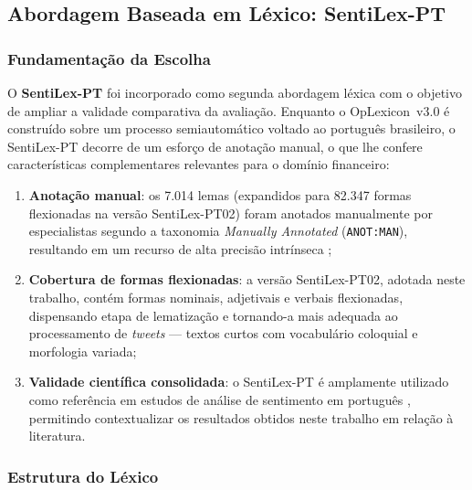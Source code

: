 \subsection{Abordagem Baseada em Léxico: SentiLex-PT}
\label{subsec:abordagem_sentilex}

\subsubsection{Fundamentação da Escolha}
\label{subsubsec:justificativa_sentilex}

O \textbf{SentiLex-PT} \cite{silva2012sentilex} foi incorporado como segunda abordagem léxica com o objetivo de ampliar a validade comparativa da avaliação. Enquanto o OpLexicon~v3.0 é construído sobre um processo semiautomático voltado ao português brasileiro, o SentiLex-PT decorre de um esforço de anotação manual, o que lhe confere características complementares relevantes para o domínio financeiro:

\begin{enumerate}
	\item \textbf{Anotação manual}: os 7.014 lemas (expandidos para 82.347 formas flexionadas na versão SentiLex-PT02) foram anotados manualmente por especialistas segundo a taxonomia \textit{Manually Annotated} (\texttt{ANOT:MAN}), resultando em um recurso de alta precisão intrínseca \cite{silva2012sentilex};

	\item \textbf{Cobertura de formas flexionadas}: a versão SentiLex-PT02, adotada neste trabalho, contém formas nominais, adjetivais e verbais flexionadas, dispensando etapa de lematização e tornando-a mais adequada ao processamento de \textit{tweets} --- textos curtos com vocabulário coloquial e morfologia variada;

	\item \textbf{Validade científica consolidada}: o SentiLex-PT é amplamente utilizado como referência em estudos de análise de sentimento em português \cite{liu2020survey}, permitindo contextualizar os resultados obtidos neste trabalho em relação à literatura.
\end{enumerate}

\subsubsection{Estrutura do Léxico}
\label{subsubsec:estrutura_sentilex}

